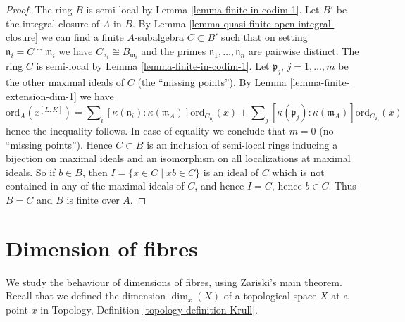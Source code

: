 \begin{proof}
The ring $B$ is semi-local by Lemma \ref{lemma-finite-in-codim-1}.
Let $B'$ be the integral closure of $A$ in $B$. By
Lemma \ref{lemma-quasi-finite-open-integral-closure}
we can find a finite $A$-subalgebra $C \subset B'$ such that
on setting $\mathfrak n_i = C \cap \mathfrak m_i$ we have
$C_{\mathfrak n_i} \cong B_{\mathfrak m_i}$ and the primes
$\mathfrak n_1, \ldots, \mathfrak n_n$ are pairwise distinct.
The ring $C$ is semi-local by Lemma \ref{lemma-finite-in-codim-1}.
Let $\mathfrak p_j$, $j = 1, \ldots, m$ be the other maximal
ideals of $C$ (the ``missing points''). By
Lemma \ref{lemma-finite-extension-dim-1} we have
$$
\text{ord}_A(x^{[L : K]}) =
\sum\nolimits_i
[\kappa(\mathfrak n_i) : \kappa(\mathfrak m_A)]
\text{ord}_{C_{\mathfrak n_i}}(x)
+
\sum\nolimits_j
[\kappa(\mathfrak p_j) : \kappa(\mathfrak m_A)]
\text{ord}_{C_{\mathfrak p_j}}(x)
$$
hence the inequality follows. In case of equality we conclude that
$m = 0$ (no ``missing points''). Hence $C \subset B$ is an inclusion
of semi-local rings inducing a bijection on maximal ideals and
an isomorphism on all localizations at maximal ideals. So if $b \in B$,
then $I = \{x \in C \mid xb \in C\}$ is an ideal of $C$ which is not
contained in any of the maximal ideals of $C$, and hence $I = C$,
hence $b \in C$. Thus $B = C$ and $B$ is finite over $A$.
\end{proof}







































\section{Dimension of fibres}
\label{section-dimension-fibres}

\noindent
We study the behaviour of dimensions of fibres, using
Zariski's main theorem. Recall that we defined the
dimension $\dim_x(X)$ of a topological space $X$ at a point $x$
in Topology, Definition \ref{topology-definition-Krull}.

